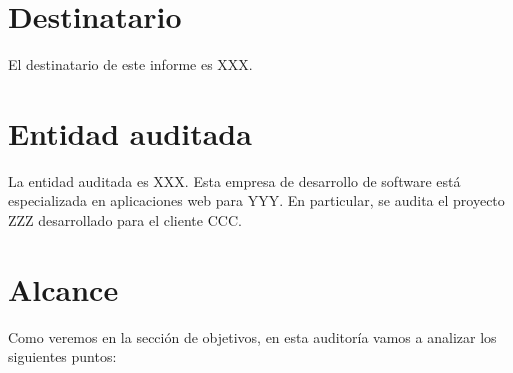 \begin{center}

%
%

%
%
%
%
%


\section*{Destinatario}

El destinatario de este informe es XXX.


\section*{Entidad auditada}

La entidad auditada es XXX. Esta empresa de desarrollo de software est\'a
especializada en aplicaciones web para YYY. En particular, se audita el
proyecto ZZZ desarrollado para el cliente CCC.

\section*{Alcance}

Como veremos en la secci\'on de objetivos, en esta auditor\'ia vamos a
analizar los siguientes puntos:


\end{center}
